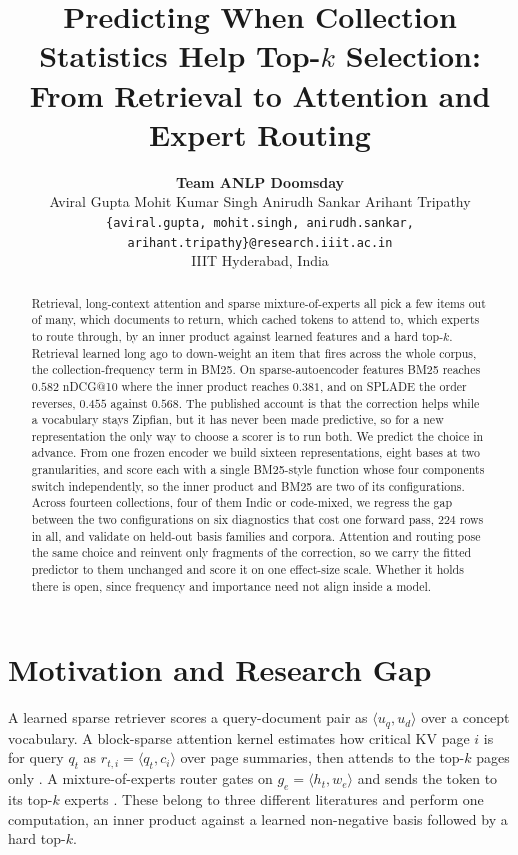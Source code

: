 \documentclass[11pt]{article}
\title{Predicting When Collection Statistics Help Top-$k$ Selection:\\
From Retrieval to Attention and Expert Routing}
\author{
  \textbf{Team ANLP Doomsday} \\[2pt]
  Aviral Gupta \quad Mohit Kumar Singh \quad Anirudh Sankar \quad Arihant Tripathy \\
  \texttt{\{aviral.gupta, mohit.singh, anirudh.sankar, arihant.tripathy\}@research.iiit.ac.in} \\
  IIIT Hyderabad, India
}
\begin{document}
\maketitle

\begin{abstract}
Retrieval, long-context attention and sparse mixture-of-experts all pick a few items
out of many, which documents to return, which cached tokens to attend to, which
experts to route through, by an inner product against learned features and a hard
top-$k$. Retrieval learned long ago to down-weight
an item that fires across the whole corpus, the collection-frequency term in BM25. On
sparse-autoencoder features BM25 reaches $0.582$ nDCG@10 where the inner product
reaches $0.381$, and on SPLADE the order reverses, $0.455$ against $0.568$. The
published account is that the correction helps while a vocabulary stays Zipfian, but it
has never been made predictive, so for a new representation the only way to choose a
scorer is to run both. We predict the choice in advance. From one frozen encoder we
build sixteen representations, eight bases at two granularities, and score each with a
single BM25-style function whose four components switch independently, so the inner
product and BM25 are two of its configurations. Across fourteen collections, four of
them Indic or code-mixed, we regress the gap between the two configurations on six
diagnostics that cost one forward pass, $224$ rows in all, and validate on held-out
basis families and corpora. Attention and routing pose the same choice and reinvent only
fragments of the correction, so we carry the fitted predictor to them unchanged and
score it on one effect-size scale. Whether it holds there is open, since frequency
and importance need not align inside a model.
\end{abstract}

\section{Motivation and Research Gap}
\label{sec:motivation}

A learned sparse retriever scores a query-document pair as
$\langle u_q, u_d \rangle$ over a concept vocabulary. A block-sparse attention
kernel estimates how critical KV page $i$ is for query $q_t$ as
$r_{t,i} = \langle q_t, c_i \rangle$ over page summaries, then attends to the
top-$k$ pages only \citep{tang2024quest}. A mixture-of-experts router gates on
$g_e = \langle h_t, w_e \rangle$ and sends the token to its top-$k$ experts
\citep{shazeer2017moe,fedus2022switch}. These belong to three different literatures
and perform one computation, an inner product against a learned non-negative basis
followed by a hard top-$k$.
\end{document}
